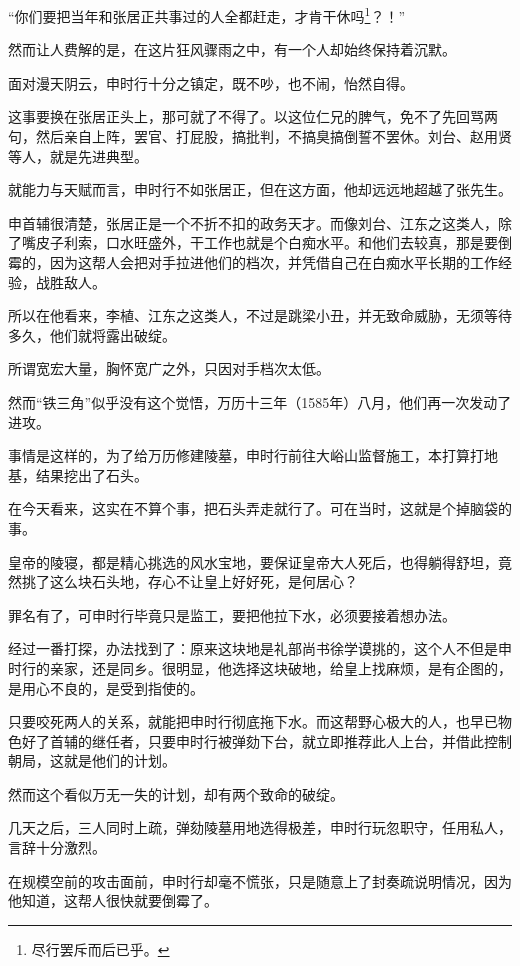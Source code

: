 \begin{multicols}{\theparacolNo}
		“你们要把当年和张居正共事过的人全都赶走，才肯干休吗\footnote{尽行罢斥而后已乎。}？！”

		然而让人费解的是，在这片狂风骤雨之中，有一个人却始终保持着沉默。

		面对漫天阴云，申时行十分之镇定，既不吵，也不闹，怡然自得。

		这事要换在张居正头上，那可就了不得了。以这位仁兄的脾气，免不了先回骂两句，然后亲自上阵，罢官、打屁股，搞批判，不搞臭搞倒誓不罢休。刘台、赵用贤等人，就是先进典型。

		就能力与天赋而言，申时行不如张居正，但在这方面，他却远远地超越了张先生。

		申首辅很清楚，张居正是一个不折不扣的政务天才。而像刘台、江东之这类人，除了嘴皮子利索，口水旺盛外，干工作也就是个白痴水平。和他们去较真，那是要倒霉的，因为这帮人会把对手拉进他们的档次，并凭借自己在白痴水平长期的工作经验，战胜敌人。

		所以在他看来，李植、江东之这类人，不过是跳梁小丑，并无致命威胁，无须等待多久，他们就将露出破绽。

		所谓宽宏大量，胸怀宽广之外，只因对手档次太低。

		然而“铁三角”似乎没有这个觉悟，万历十三年（1585年）八月，他们再一次发动了进攻。

		事情是这样的，为了给万历修建陵墓，申时行前往大峪山监督施工，本打算打地基，结果挖出了石头。

		在今天看来，这实在不算个事，把石头弄走就行了。可在当时，这就是个掉脑袋的事。

		皇帝的陵寝，都是精心挑选的风水宝地，要保证皇帝大人死后，也得躺得舒坦，竟然挑了这么块石头地，存心不让皇上好好死，是何居心？

		罪名有了，可申时行毕竟只是监工，要把他拉下水，必须要接着想办法。

		经过一番打探，办法找到了：原来这块地是礼部尚书徐学谟挑的，这个人不但是申时行的亲家，还是同乡。很明显，他选择这块破地，给皇上找麻烦，是有企图的，是用心不良的，是受到指使的。

		只要咬死两人的关系，就能把申时行彻底拖下水。而这帮野心极大的人，也早已物色好了首辅的继任者，只要申时行被弹劾下台，就立即推荐此人上台，并借此控制朝局，这就是他们的计划。

		然而这个看似万无一失的计划，却有两个致命的破绽。

		几天之后，三人同时上疏，弹劾陵墓用地选得极差，申时行玩忽职守，任用私人，言辞十分激烈。

		在规模空前的攻击面前，申时行却毫不慌张，只是随意上了封奏疏说明情况，因为他知道，这帮人很快就要倒霉了。


\end{multicols}
